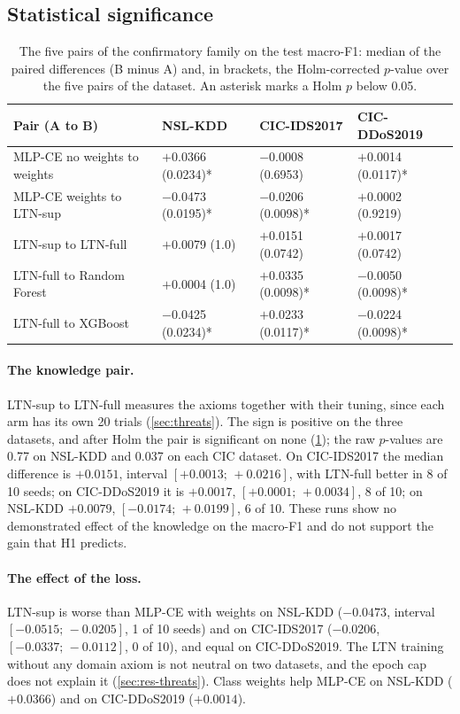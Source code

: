 \subsection{Statistical significance}
\label{sec:res-significance}

\begin{table}[t]
\centering
\footnotesize
\caption{The five pairs of the confirmatory family on the test macro-F1: median of the paired
differences (B minus A) and, in brackets, the Holm-corrected $p$-value over the five pairs of the
dataset. An asterisk marks a Holm $p$ below 0.05.}
\label{tab:res-pairs}
\setlength{\tabcolsep}{4pt}
\begin{tabular}{@{}p{3.9cm}lll@{}}
\toprule
Pair (A to B) & NSL-KDD & CIC-IDS2017 & CIC-DDoS2019 \\
\midrule
MLP-CE no weights to weights & $+$0.0366 (0.0234)* & $-$0.0008 (0.6953) & $+$0.0014 (0.0117)* \\
MLP-CE weights to LTN-sup    & $-$0.0473 (0.0195)* & $-$0.0206 (0.0098)* & $+$0.0002 (0.9219) \\
LTN-sup to LTN-full          & $+$0.0079 (1.0) & $+$0.0151 (0.0742) & $+$0.0017 (0.0742) \\
LTN-full to Random Forest    & $+$0.0004 (1.0) & $+$0.0335 (0.0098)* & $-$0.0050 (0.0098)* \\
LTN-full to XGBoost          & $-$0.0425 (0.0234)* & $+$0.0233 (0.0117)* & $-$0.0224 (0.0098)* \\
\bottomrule
\end{tabular}
\end{table}

\paragraph{The knowledge pair.}
LTN-sup to LTN-full measures the axioms together with their tuning, since each arm has its own 20 trials
(\cref{sec:threats}). The sign is positive on the three datasets, and after
Holm the pair is significant on none (\cref{tab:res-pairs}); the raw $p$-values are 0.77 on NSL-KDD and
0.037 on each CIC dataset. On CIC-IDS2017 the median difference is $+0.0151$, interval
$[+0.0013;\,+0.0216]$, with LTN-full better in 8 of 10 seeds; on CIC-DDoS2019 it is $+0.0017$,
$[+0.0001;\,+0.0034]$, 8 of 10; on NSL-KDD $+0.0079$, $[-0.0174;\,+0.0199]$, 6 of 10. These runs show no
demonstrated effect of the knowledge on the macro-F1 and do not support the gain that H1 predicts.

\paragraph{The effect of the loss.}
LTN-sup is worse than MLP-CE with weights on NSL-KDD ($-0.0473$, interval $[-0.0515;\,-0.0205]$, 1 of 10
seeds) and on CIC-IDS2017 ($-0.0206$, $[-0.0337;\,-0.0112]$, 0 of 10), and equal on CIC-DDoS2019. The LTN
training without any domain axiom is not neutral on two datasets, and the epoch cap does not explain it
(\cref{sec:res-threats}). Class weights help MLP-CE on NSL-KDD ($+0.0366$) and on CIC-DDoS2019 ($+0.0014$).

